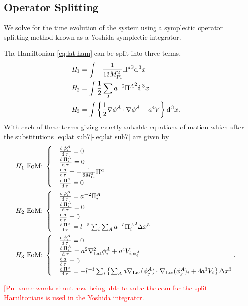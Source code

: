 \subsection{Operator Splitting}
We solve for the time evolution of the system using a symplectic operator splitting method known as a Yoshida symplectic integrator.

The Hamiltonian \eqref{eq:lat ham} can be split into three terms,
\begin{align} 
  & H_1 = \int-\frac{1}{12M_{\mathrm{Pl}}^2}{\Pi^a}^2\mathrm{d}\,^3x  \label{eq:ham split1}  \\
  & H_2 = \int\frac{1}{2}\sum_Aa^{-2}{\Pi^A}^2\mathrm{d}\,^3x  \label{eq:ham split2}  \\
  & H_3 = \int\left\{\frac{1}{2}\nabla\phi^A\cdot\nabla\phi^A + a^4V\right\}\mathrm{d}\,^3x. \label{eq:ham split3}
\end{align}
With each of these terms giving exactly solvable equations of motion which after the substitutions \eqref{eq:lat sub7}-\eqref{eq:lat sub7} are given by
\begin{align}
  H_1 \text{ EoM: }
  & \begin{cases}
      & \frac{\mathrm{d}\,\phi^A_i}{\mathrm{d}\,\tau} = 0 \\
      & \frac{\mathrm{d}\,\Pi^A_i}{\mathrm{d}\,\tau} = 0 \\
      & \frac{\mathrm{d}\, a}{\mathrm{d}\,\tau} = -\frac{1}{6M_{\mathrm{Pl}}^2}\Pi^a \\
      & \frac{\mathrm{d}\,\Pi^a}{\mathrm{d}\,\tau} = 0
    \end{cases} \\
  H_2 \text{ EoM: }
  & \begin{cases}
      & \frac{\mathrm{d}\,\phi^A_i}{\mathrm{d}\,\tau} = a^{-2}\Pi^A_i \\
      & \frac{\mathrm{d}\,\Pi^A_i}{\mathrm{d}\,\tau} = 0 \\
      & \frac{\mathrm{d}\, a}{\mathrm{d}\,\tau} = 0 \\
      & \frac{\mathrm{d}\,\Pi^a}{\mathrm{d}\,\tau} = l^{-3}\sum_i\sum_Aa^{-3}{\Pi^A_i}^2\Delta x^3
    \end{cases} \\
  H_3 \text{ EoM: }
  & \begin{cases}
      & \frac{\mathrm{d}\,\phi^A_i}{\mathrm{d}\,\tau} = 0 \\
      & \frac{\mathrm{d}\,\Pi^A_i}{\mathrm{d}\,\tau} = a^2\nabla^2_{\mathrm{Lat}}\phi^A_i + a^4V_{i,\phi^A_i} \\
      & \frac{\mathrm{d}\, a}{\mathrm{d}\,\tau} = 0 \\
      & \frac{\mathrm{d}\,\Pi^a}{\mathrm{d}\,\tau} = -l^{-3}\sum_i\left\{
      \sum_Aa\nabla_{\mathrm{Lat}}(\phi^A_j)\cdot\nabla_{\mathrm{Lat}}(\phi^A_j)_i +4a^3V_i
      \right\}\Delta x^3
    \end{cases}.
\end{align}

\textcolor{red}{[Put some words about how being able to solve the eom for the split Hamiltonians is used in the Yoshida integrator.]}
